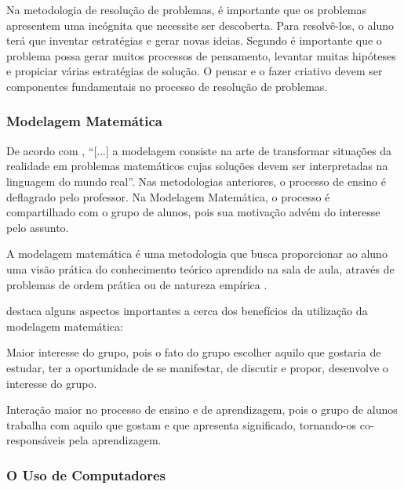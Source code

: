 Na metodologia de resolução de problemas, é importante que os problemas apresentem uma incógnita que necessite ser descoberta. Para resolvê-los, o aluno terá que inventar estratégias e gerar novas ideias. Segundo  é importante que o problema possa gerar muitos processos de pensamento, levantar muitas hipóteses e propiciar várias estratégias de solução. O pensar e o fazer criativo devem ser componentes fundamentais no processo de resolução de problemas.

\subsubsection{Modelagem Matemática}

De acordo com , “[...] a modelagem consiste na arte de transformar situações da realidade em problemas matemáticos cujas soluções devem ser interpretadas na linguagem do mundo real”. Nas metodologias anteriores, o processo de ensino é deflagrado pelo professor. Na Modelagem Matemática, o processo é compartilhado com o grupo de alunos, pois sua motivação advém
do interesse pelo assunto. 

A modelagem matemática é uma metodologia que busca proporcionar ao aluno uma visão prática do conhecimento teórico aprendido na sala de aula, através de problemas de ordem prática ou de natureza empírica \cite{fossa1998tendencias}. 

 destaca alguns aspectos importantes a cerca dos benefícios da utilização da modelagem matemática:

\begin{alineascomponto}
	\item Maior interesse do grupo, pois o fato do grupo escolher aquilo que gostaria de estudar, ter a oportunidade de se manifestar, de discutir e propor, desenvolve o interesse do grupo.
    \item Interação maior no processo de ensino e de aprendizagem, pois o grupo de alunos trabalha com aquilo que gostam e que apresenta significado, tornando-os co-responsáveis pela aprendizagem. 
\end{alineascomponto}


\subsubsection{O Uso de Computadores}

